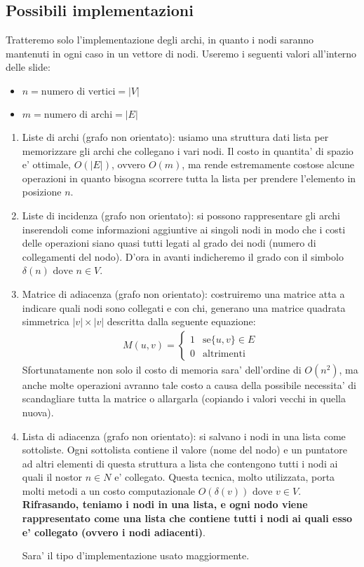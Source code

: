 \documentclass{article}
\begin{document}
\subsection{Possibili implementazioni}

Tratteremo solo l'implementazione degli archi, in quanto i nodi saranno mantenuti
in ogni caso in un vettore di nodi. Useremo i seguenti valori all'interno delle slide:
\begin{itemize}
  \item $n = \text{numero di vertici} = |V|$
  \item $m = \text{numero di archi} = |E|$
\end{itemize}

\begin{enumerate}
  \item Liste di archi (grafo non orientato): usiamo una struttura dati lista
    per memorizzare gli archi che collegano i vari nodi. Il costo in quantita'
    di spazio e' ottimale, $O(|E|)$, ovvero $O(m)$, ma rende estremamente costose
    alcune operazioni in quanto bisogna scorrere tutta la lista per prendere
    l'elemento in posizione $n$.
  \item Liste di incidenza (grafo non orientato): si possono rappresentare gli
    archi inserendoli come informazioni aggiuntive ai singoli nodi in modo che
    i costi delle operazioni siano quasi tutti legati al grado dei nodi (numero
    di collegamenti del nodo). D'ora in avanti indicheremo il grado con il simbolo
    $\delta(n) \text{ dove } n \in V$.
  \item Matrice di adiacenza (grafo non orientato): costruiremo una matrice atta
    a indicare quali nodi sono collegati e con chi, generano una matrice quadrata
    simmetrica $|v| \times |v|$ descritta dalla seguente equazione:
    \begin{align*}
      M(u, v) = \begin{cases}
        1 &\text{se} \{u, v\} \in E \\
        0 &\text{altrimenti}
      \end{cases}
    \end{align*}
    Sfortunatamente non solo il costo di memoria sara' dell'ordine di $O(n^2)$,
    ma anche molte operazioni avranno tale costo a causa della possibile necessita'
    di scandagliare tutta la matrice o allargarla (copiando i valori vecchi in
    quella nuova).
  \item Lista di adiacenza (grafo non orientato): si salvano i nodi in una lista
    come sottoliste. Ogni sottolista contiene il valore (nome del nodo) e un puntatore
    ad altri elementi di questa struttura a lista che contengono tutti i nodi ai quali
    il nostor $n \in N$ e' collegato. Questa tecnica, molto utilizzata, porta
    molti metodi a un costo computazionale $O(\delta(v)) \text{ dove } v \in V$.
    \textbf{Rifrasando, teniamo i nodi in una lista, e ogni nodo viene rappresentato
      come una lista che contiene tutti i nodi ai quali esso e' collegato (ovvero i
    nodi adiacenti)}.

    Sara' il tipo d'implementazione usato maggiormente.
\end{enumerate}
\end{document}
